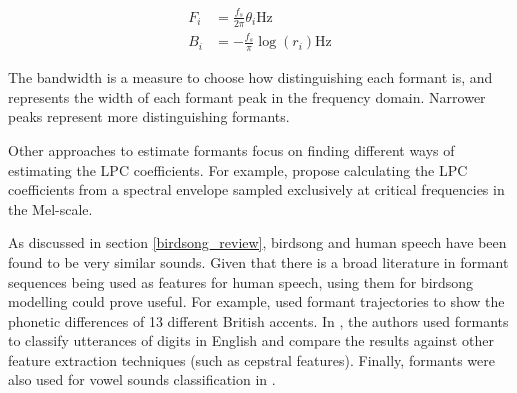 \documentclass[../main.tex]{subfiles}
\begin{document}
\begin{align*}
F_i &= \frac{f_s}{2\pi}\theta_i \text{Hz}\\
B_i &= -\frac{f_s}{\pi}\log{(r_i)} \text{Hz}
\end{align*}
\par The bandwidth is a measure to choose how distinguishing each formant is, and represents the width of each formant peak in the frequency domain. Narrower peaks represent more distinguishing formants. 
\par Other approaches to estimate formants focus on finding different ways of estimating the LPC coefficients. For example, \cite{Darch,Araujo1998} propose calculating the LPC coefficients from a spectral envelope sampled exclusively at critical frequencies in the Mel-scale.
\par As discussed in section \ref{birdsong_review}, birdsong and human speech have been found to be very similar sounds. Given that there is a broad literature in formant sequences being used as features for human speech, using them for birdsong modelling could prove useful. For example, \cite{Ferragne2010} used formant trajectories to show the phonetic differences of 13 different British accents. In \cite{Holmes1895}, the authors used formants to classify utterances of digits in English and compare the results against other feature extraction techniques (such as cepstral features). Finally, formants were also used for vowel sounds classification in \cite{markel1976}.
\end{document}

